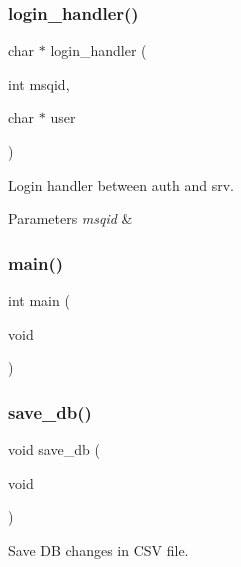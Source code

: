 \mbox{\label{auth_8c_a2ae0b35395445cc6e6d98c859c83ae32}} 
\subsubsection{login\+\_\+handler()}
{\footnotesize\ttfamily char $\ast$ login\+\_\+handler (\begin{DoxyParamCaption}\item[{int}]{msqid,  }\item[{char $\ast$}]{user }\end{DoxyParamCaption})}



Login handler between auth and srv. 


\begin{DoxyParams}{Parameters}
{\em msqid} & \\
\hline
\end{DoxyParams}
\mbox{\label{auth_8c_a840291bc02cba5474a4cb46a9b9566fe}} 
\subsubsection{main()}
{\footnotesize\ttfamily int main (\begin{DoxyParamCaption}\item[{void}]{ }\end{DoxyParamCaption})}

\mbox{\label{auth_8c_afeb75f74451938ff9dc7617224f6fe3f}} 
\subsubsection{save\+\_\+db()}
{\footnotesize\ttfamily void save\+\_\+db (\begin{DoxyParamCaption}\item[{void}]{ }\end{DoxyParamCaption})}



Save DB changes in C\+SV file. 

